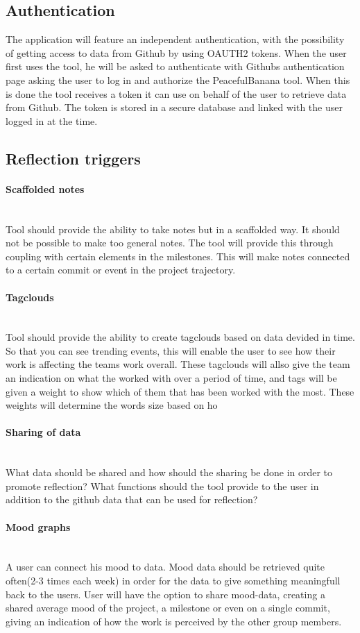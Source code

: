 \subsection{Authentication}
The application will feature an independent authentication, with the possibility of getting access to data from Github by using OAUTH2 tokens. When the user first uses the tool, he will be asked to authenticate with Githubs authentication page asking the user to log in and authorize the PeacefulBanana tool. When this is done the tool receives a token it can use on behalf of the user to retrieve data from Github. The token is stored in a secure database and linked with the user logged in at the time. 

\subsection{Reflection triggers}
\paragraph{Scaffolded notes}\mbox{}\\
Tool should provide the ability to take notes but in a scaffolded way. It should not be possible to make too general notes. The tool will provide this through coupling with certain elements in the milestones. This will make notes connected to a certain commit or event in the project trajectory. 

\paragraph{Tagclouds}\mbox{}\\
Tool should provide the ability to create tagclouds based on data devided in time. So that you can see trending events, this will enable the user to see how their work is affecting the teams work overall. These tagclouds will allso give the team an indication on what the worked with over a period of time, and tags will be given a weight to show which of them that has been worked with the most. These weights will determine the words size based on ho

\paragraph{Sharing of data}\mbox{}\\
What data should be shared and how should the sharing be done in order to promote reflection? What functions should the tool provide to the user in addition to the github data that can be used for reflection?

\paragraph{Mood graphs}\mbox{}\\
A user can connect his mood to data. Mood data should be retrieved quite often(2-3 times each week) in order for the data to give something meaningfull back to the users.
User will have the option to share mood-data, creating a shared average mood of the project, a milestone or even on a single commit, giving an indication of how the work is perceived by the other group members. 
